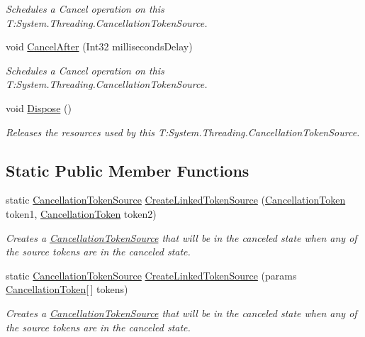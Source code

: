 \begin{DoxyCompactItemize}
\begin{DoxyCompactList}\small\item\em Schedules a Cancel operation on this T\+:\+System.\+Threading.\+Cancellation\+Token\+Source. \end{DoxyCompactList}\item 
void \hyperlink{class_system_1_1_threading_1_1_cancellation_token_source_a5cc808d20003688249b2f080ebe18c23}{Cancel\+After} (Int32 milliseconds\+Delay)
\begin{DoxyCompactList}\small\item\em Schedules a Cancel operation on this T\+:\+System.\+Threading.\+Cancellation\+Token\+Source. \end{DoxyCompactList}\item 
void \hyperlink{class_system_1_1_threading_1_1_cancellation_token_source_afc50851c41375492d93a0f8ca40cf639}{Dispose} ()
\begin{DoxyCompactList}\small\item\em Releases the resources used by this T\+:\+System.\+Threading.\+Cancellation\+Token\+Source. \end{DoxyCompactList}\end{DoxyCompactItemize}
\subsection*{Static Public Member Functions}
\begin{DoxyCompactItemize}
\item 
static \hyperlink{class_system_1_1_threading_1_1_cancellation_token_source}{Cancellation\+Token\+Source} \hyperlink{class_system_1_1_threading_1_1_cancellation_token_source_a7c4b574cce3267bac2e4996ec64bb2eb}{Create\+Linked\+Token\+Source} (\hyperlink{struct_system_1_1_threading_1_1_cancellation_token}{Cancellation\+Token} token1, \hyperlink{struct_system_1_1_threading_1_1_cancellation_token}{Cancellation\+Token} token2)
\begin{DoxyCompactList}\small\item\em Creates a \hyperlink{}{Cancellation\+Token\+Source} that will be in the canceled state when any of the source tokens are in the canceled state. \end{DoxyCompactList}\item 
static \hyperlink{class_system_1_1_threading_1_1_cancellation_token_source}{Cancellation\+Token\+Source} \hyperlink{class_system_1_1_threading_1_1_cancellation_token_source_ae191709b944a313983bece1bc0ec4bde}{Create\+Linked\+Token\+Source} (params \hyperlink{struct_system_1_1_threading_1_1_cancellation_token}{Cancellation\+Token}\mbox{[}$\,$\mbox{]} tokens)
\begin{DoxyCompactList}\small\item\em Creates a \hyperlink{}{Cancellation\+Token\+Source} that will be in the canceled state when any of the source tokens are in the canceled state. \end{DoxyCompactList}\end{DoxyCompactItemize}
